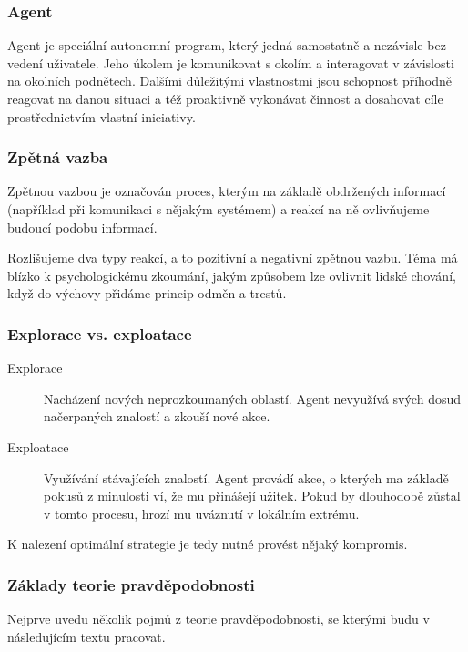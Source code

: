 \documentclass[thesis=M,czech]{FITthesis}[2014/05/07]
\begin{document}
\subsubsection{Agent}
\label{agent}
Agent je speciální autonomní program, který jedná samostatně a nezávisle bez vedení uživatele. Jeho úkolem je komunikovat s okolím a interagovat v závislosti na okolních podnětech. Dalšími důležitými vlastnostmi jsou schopnost příhodně reagovat na danou situaci a též proaktivně vykonávat činnost a dosahovat cíle prostřednictvím vlastní iniciativy.

\subsubsection{Zpětná vazba}
\label{feedback}
Zpětnou vazbou je označován proces, kterým na základě obdržených informací (například při komunikaci s nějakým systémem) a reakcí na ně ovlivňujeme budoucí podobu informací.

Rozlišujeme dva typy reakcí, a to pozitivní a negativní zpětnou vazbu. Téma má blízko k psychologickému zkoumání, jakým způsobem lze ovlivnit lidské chování, když do výchovy přidáme princip odměn a trestů.

\subsubsection{Explorace vs. exploatace}
\label{sub:explo}

\begin{description}
  \item[Explorace] Nacházení nových neprozkoumaných oblastí. Agent nevyužívá svých dosud načerpaných znalostí a zkouší nové akce. 
  \item[Exploatace] Využívání stávajících znalostí. Agent provádí akce, o kterých ma základě pokusů z minulosti ví, že mu přinášejí užitek. Pokud by dlouhodobě zůstal v tomto procesu, hrozí mu uváznutí v lokálním extrému.
\end{description}	

K nalezení optimální strategie je tedy nutné provést nějaký kompromis.

\subsubsection{Základy teorie pravděpodobnosti}

Nejprve uvedu několik pojmů z teorie pravděpodobnosti, se kterými budu v následujícím textu pracovat.
\end{document}

